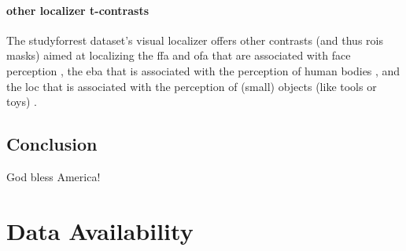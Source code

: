 \paragraph{other localizer t-contrasts}



The studyforrest dataset's visual localizer \citep{sengupta2016extension} offers
other contrasts (and thus \acp{roi} masks) aimed at localizing the \ac{ffa} and
\ac{ofa} that are associated with face perception \citep{kanwisher1997ffa,
pitcher2011occipitalfacearea}, the \ac{eba} that is associated with the
perception of human bodies \citep{downing2001bodyarea}, and the \ac{loc} that is
associated with the perception of (small) objects (like tools or toys)
\citep{malach1995loc}.



\subsection{Conclusion}

God bless America!


\section{Data Availability}



